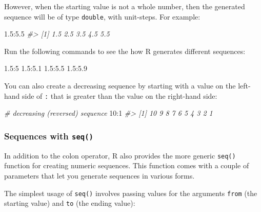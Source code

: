 \documentclass[
]{book}
\newenvironment{Shaded}{\begin{snugshade}}{\end{snugshade}}
\newcommand{\CommentTok}[1]{\textcolor[rgb]{0.56,0.35,0.01}{\textit{#1}}}
\newcommand{\DecValTok}[1]{\textcolor[rgb]{0.00,0.00,0.81}{#1}}
\newcommand{\FloatTok}[1]{\textcolor[rgb]{0.00,0.00,0.81}{#1}}
\newcommand{\SpecialCharTok}[1]{\textcolor[rgb]{0.00,0.00,0.00}{#1}}
\begin{document}
However, when the starting value is not a whole number, then the generated
sequence will be of type \texttt{double}, with unit-steps. For example:

\begin{Shaded}
\begin{Highlighting}[]
\FloatTok{1.5}\SpecialCharTok{:}\FloatTok{5.5}
\CommentTok{\#\textgreater{} [1] 1.5 2.5 3.5 4.5 5.5}
\end{Highlighting}
\end{Shaded}

Run the following commands to see the how R generates different sequences:

\begin{Shaded}
\begin{Highlighting}[]
\FloatTok{1.5}\SpecialCharTok{:}\DecValTok{5}
\FloatTok{1.5}\SpecialCharTok{:}\FloatTok{5.1}
\FloatTok{1.5}\SpecialCharTok{:}\FloatTok{5.5}
\FloatTok{1.5}\SpecialCharTok{:}\FloatTok{5.9}
\end{Highlighting}
\end{Shaded}

You can also create a decreasing sequence by starting with a value on the
left-hand side of \texttt{:} that is greater than the value on the right-hand side:

\begin{Shaded}
\begin{Highlighting}[]
\CommentTok{\# decreasing (reversed) sequence}
\DecValTok{10}\SpecialCharTok{:}\DecValTok{1}
\CommentTok{\#\textgreater{}  [1] 10  9  8  7  6  5  4  3  2  1}
\end{Highlighting}
\end{Shaded}

\hypertarget{sequences-with-seq}{%
\subsubsection*{\texorpdfstring{Sequences with \texttt{seq()}}{Sequences with seq()}}\label{sequences-with-seq}}

In addition to the colon operator, R also provides the more generic \texttt{seq()}
function for creating numeric sequences. This function comes with a couple of
parameters that let you generate sequences in various forms.

The simplest usage of \texttt{seq()} involves passing values for the arguments \texttt{from}
(the starting value) and \texttt{to} (the ending value):
\end{document}
